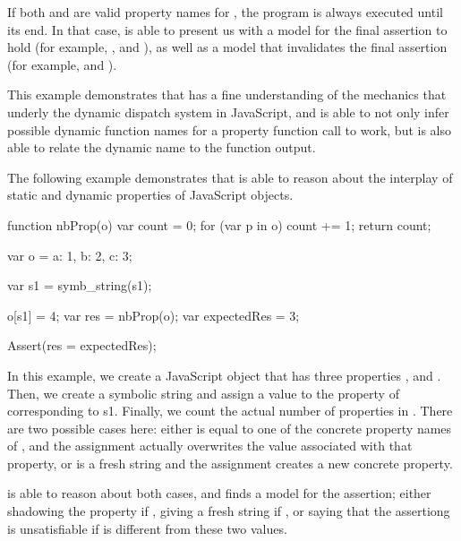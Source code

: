 If both  and  are valid property names for , the program is always executed until its end.
In that case, \cosette is able to present us with a model for the final assertion to hold (for example, , and ), as well as a model that invalidates the final assertion (for example,  and ).

This example demonstrates that \cosette has a fine understanding of the mechanics that underly the dynamic dispatch system in JavaScript, and is able to not only infer possible dynamic function names for a property function call to work, but is also able to relate the dynamic name to the function output.


The following example demonstrates that \cosette is able to reason about the interplay of static and dynamic properties of JavaScript objects.

\begin{lstjs}

function nbProp(o) {
  var count = 0;
  for (var p in o) {
    count += 1;
  }
  return count;
}

var o = {a: 1, b: 2, c: 3};

var s1 = symb_string(s1);

o[s1] = 4;
var res = nbProp(o);
var expectedRes = 3;

Assert(res = expectedRes);
\end{lstjs}

In this example, we create a JavaScript object  that has three properties , and .
Then, we create a symbolic string  and assign a value to the property of  corresponding to {s1}.
Finally, we count the actual number of properties in .
There are two possible cases here: either  is equal to one of the concrete property names of , and the assignment actually overwrites the value associated with that property, or  is a fresh string and the assignment creates a new concrete property.

\cosette is able to reason about both cases, and finds a model for the assertion; either shadowing the property if , giving a fresh string if , or saying that the assertiong is unsatisfiable if  is different from these two values.

